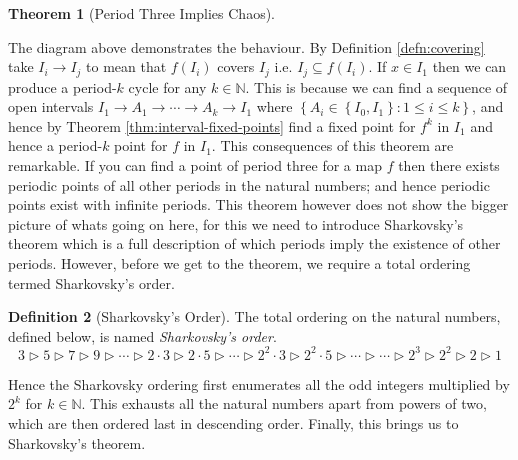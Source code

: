 \documentclass[11pt,a4paper,oneside]{memoir}
\theoremstyle{plain}
\newtheorem{thm}{Theorem}[chapter]
\theoremstyle{definition}
\newtheorem{defn}[thm]{Definition}
\begin{document}
\begin{thm}[Period Three Implies Chaos]
    \begin{center}
    \end{center}

\end{thm}
The diagram above demonstrates the behaviour. By Definition \ref{defn:covering} take $I_i \to I_j$ to mean that $f(I_i)$ covers $I_j$ i.e. $I_j \subseteq f(I_i)$. If $x \in I_1$ then we can produce a period-$k$ cycle for any $k \in \mathbb{N}$. This is because we can find a sequence of open intervals $I_1 \to A_1 \to \cdots \to A_k \to I_1$ where $\left\lbrace A_i \in \left\lbrace I_0, I_1 \right\rbrace : 1 \leq i \leq k \right\rbrace$, and hence by Theorem \ref{thm:interval-fixed-points} find a fixed point for $f^k$ in $I_1$ and hence a period-$k$ point for $f$ in $I_1$.
This consequences of this theorem are remarkable. If you can find a point of period three for a map $f$ then there exists periodic points of all other periods in the natural numbers; and hence periodic points exist with infinite periods. This theorem however does not show the bigger picture of whats going on here, for this we need to introduce Sharkovsky's theorem which is a full description of which periods imply the existence of other periods. However, before we get to the theorem, we require a total ordering termed Sharkovsky's order.

\begin{defn}[Sharkovsky's Order]
    The total ordering on the natural numbers, defined below, is named \emph{Sharkovsky's order}. \[ 3 \rhd 5 \rhd 7 \rhd 9 \rhd \cdots \rhd 2 \cdot 3 \rhd 2 \cdot 5 \rhd \cdots \rhd 2^2 \cdot 3 \rhd 2^2 \cdot 5 \rhd \cdots \rhd \cdots \rhd 2^3 \rhd 2^2 \rhd 2 \rhd 1 \]
\end{defn}

Hence the Sharkovsky ordering first enumerates all the odd integers multiplied by $2^k$ for $k \in \mathbb{N}$. This exhausts all the natural numbers apart from powers of two, which are then ordered last in descending order. Finally, this brings us to Sharkovsky's theorem.
\end{document}
